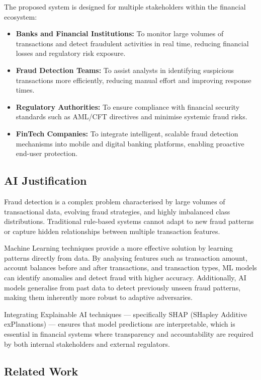 \documentclass[12pt,a4paper]{article}
\begin{document}
The proposed system is designed for multiple stakeholders within the financial ecosystem:

\begin{itemize}[noitemsep]
  \item \textbf{Banks and Financial Institutions:} To monitor large volumes of transactions and detect fraudulent activities in real time, reducing financial losses and regulatory risk exposure.
  \item \textbf{Fraud Detection Teams:} To assist analysts in identifying suspicious transactions more efficiently, reducing manual effort and improving response times.
  \item \textbf{Regulatory Authorities:} To ensure compliance with financial security standards such as AML/CFT directives and minimise systemic fraud risks.
  \item \textbf{FinTech Companies:} To integrate intelligent, scalable fraud detection mechanisms into mobile and digital banking platforms, enabling proactive end-user protection.
\end{itemize}

\subsection{AI Justification}

Fraud detection is a complex problem characterised by large volumes of transactional data, evolving fraud strategies, and highly imbalanced class distributions. Traditional rule-based systems cannot adapt to new fraud patterns or capture hidden relationships between multiple transaction features.

Machine Learning techniques provide a more effective solution by learning patterns directly from data. By analysing features such as transaction amount, account balances before and after transactions, and transaction types, ML models can identify anomalies and detect fraud with higher accuracy. Additionally, AI models generalise from past data to detect previously unseen fraud patterns, making them inherently more robust to adaptive adversaries.

Integrating Explainable AI techniques --- specifically SHAP (SHapley Additive exPlanations) --- ensures that model predictions are interpretable, which is essential in financial systems where transparency and accountability are required by both internal stakeholders and external regulators.

\subsection{Related Work}
\end{document}
